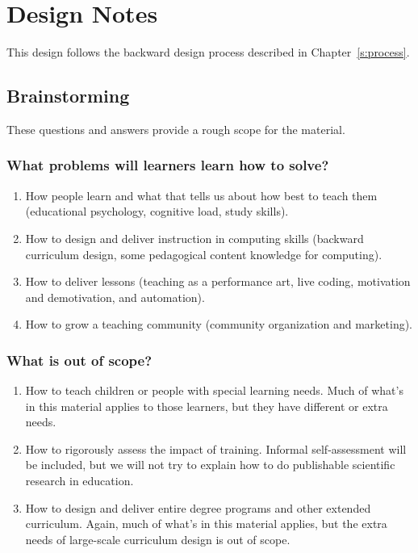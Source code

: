 \chapter{Design Notes}\label{s:v3}

This design follows the backward design process described in
Chapter~\ref{s:process}.

\section{Brainstorming}\label{s:v3-brainstorming}

These questions and answers provide a rough scope for the material.

\subsection*{What problems will learners learn how to solve?}

  \begin{enumerate}
  \item
    How people learn and what that tells us about how best to teach
    them (educational psychology, cognitive load, study skills).
  \item
    How to design and deliver instruction in computing skills
    (backward curriculum design, some pedagogical content knowledge
    for computing).
  \item
    How to deliver lessons (teaching as a performance art, live
    coding, motivation and demotivation, and automation).
  \item
    How to grow a teaching community (community organization and
    marketing).
  \end{enumerate}

\subsection*{What is out of scope?}

  \begin{enumerate}
  \item
    How to teach children or people with special learning needs.
    Much of what's in this material applies to those learners, but
    they have different or extra needs.
  \item
    How to rigorously assess the impact of training. Informal
    self-assessment will be included, but we will not try to explain
    how to do publishable scientific research in education.
  \item
    How to design and deliver entire degree programs and other
    extended curriculum. Again, much of what's in this material
    applies, but the extra needs of large-scale curriculum design is
    out of scope.
  \end{enumerate}

